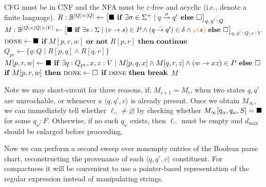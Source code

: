 \documentclass[popl.tex]{subfiles}
\begin{document}
\begin{algorithm}[H]
\caption{\texttt{cfl\_fixpt} pseudocode}
\label{alg:cfl_fixpt}
\begin{algorithmic}[1]
\Require CFG must be in CNF and the NFA must be $\varepsilon$-free and acyclic (i.e., denote a finite language).
\State $R: \mathbb{B}^{|Q|\times |Q|} \gets \big[\blacksquare \textbf{ if } \exists \sigma \in \Sigma^+ \mid q \overset{\sigma}{\rightsquigarrow} q' \textbf{ else } \square\big]_{q,\,q'\,:\, Q}$ 
\State $M: \mathbb{B}^{|Q|\times |Q| \times |V|} \gets \big[\blacksquare \textbf{ if } \exists s: \Sigma \mid (v \rightarrow s) \in P \land (q \overset{{\color{orange}\varphi}}{\rightarrow} q') \in \delta \land {\color{orange}\varphi(}s{\color{orange})} \textbf{ else } \square\big]_{q,\,q'\,:\,Q,\,v\,:\,V}$
 
\State $\textsc{done} \gets \blacksquare$
 
  \State $\textbf{if } M[p, r, w] \textbf{ or not } R[p, r] \textbf{ then continue}$
  \State $Q_{pr} \gets \big\{q: Q \mid R[p, q] \land R[q, r]\big\}$ 
  \State $M[p, r, w] \gets \blacksquare \textbf{ if } \exists q: Q_{pr}, x, z: V \mid M[p, q, x] \land M[q, r, z] \land (w \rightarrow x z) \in P \textbf { else } \square$
  \State $\textbf{if } M[p, r, w] \textbf{ then } \textsc{done} \gets \square$
\EndFor
\State $\textbf{if }\textsc{done} \textbf{ then break}$
\EndFor
\State \Return $M$ 
\EndProcedure
  \end{algorithmic}
\end{algorithm}\vspace{-0.2cm}

\noindent Note we may short-circuit for three reasons, if: $M_{i+1} = M_i$, when two states $q, q'$ are unreachable, or whenever a $\langle q, q', v\rangle$ is already present. Once we obtain $M_\infty$, we can immediately tell whether $\ell_\cap \neq \varnothing$ by checking whether $M_\infty[q_\alpha, q_\omega, S] = \blacksquare$ for some $q_\omega: F$. Otherwise, if no such $q_\omega$ exists, then $\ell_\cap$ must be empty and $d_{\max}$ should be enlarged before proceeding.

\noindent Now we can perform a second sweep over nonempty entries of the Boolean parse chart, reconstructing the provenance of each $\langle q, q', v\rangle$ constituent. For compactness it will be convenient to use a pointer-based representation of the regular expression instead of manipulating strings.
\end{document}
